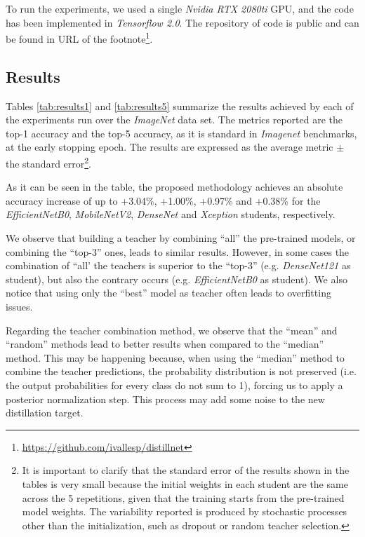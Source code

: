 \documentclass{elsarticle}
\begin{document}
	 To run the experiments, we used a single \textit{Nvidia RTX 2080ti} GPU, and the code has been implemented in \textit{Tensorflow 2.0}. The repository of code is public and can be found in URL of the footnote\footnote{\url{https://github.com/ivallesp/distillnet}}.

	\subsection{Results}  \label{sec:results}
	Tables \ref{tab:results1} and \ref{tab:results5} summarize the results achieved by each of the experiments run over the \textit{ImageNet} data set. The metrics reported are the top-1 accuracy and the top-5 accuracy, as it is standard in \textit{Imagenet} benchmarks, at the early stopping epoch. The results are expressed as the average metric $\pm$ the standard error\footnote{It is important to clarify that the standard error of the results shown in the tables is very small because the initial weights in each student are the same across the 5 repetitions, given that the training starts from the pre-trained model weights. The variability reported is produced by stochastic processes other than the initialization, such as dropout or random teacher selection.}.

	As it can be seen in the table, the proposed methodology achieves an absolute accuracy increase of up to +3.04\%, +1.00\%, +0.97\% and +0.38\% for the \textit{EfficientNetB0}, \textit{MobileNetV2},  \textit{DenseNet} and \textit{Xception} students, respectively.

	We observe that building a teacher by combining ``all'' the pre-trained models, or combining the ``top-3'' ones, leads to similar results. However, in some cases the combination of ``all' the teachers is superior to the ``top-3'' (e.g. \textit{DenseNet121} as student), but also the contrary occurs (e.g. \textit{EfficientNetB0} as student). We also notice that using only the ``best'' model as teacher often leads to overfitting issues.

	Regarding the teacher combination method, we observe that the ``mean'' and ``random'' methods lead to better results when compared to the ``median'' method. This may be happening because, when using the ``median'' method to combine the teacher predictions, the probability distribution is not preserved (i.e. the output probabilities for every class do not sum to 1), forcing us to apply a posterior normalization step. This process may add some noise to the new distillation target.
\end{document}

